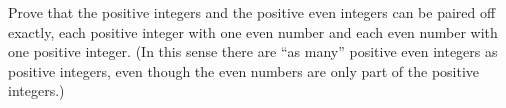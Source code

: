 Prove that the positive integers and the positive even integers can be paired off exactly, each positive integer with one even number and each even number with one positive integer. (In this sense there are ``as many'' positive even integers as positive integers, even though the even numbers are only part of the positive integers.)
